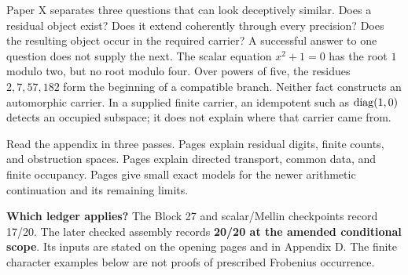 Paper X separates three questions that can look deceptively similar. Does a residual object exist? Does it extend coherently through every precision? Does the resulting object occur in the required carrier? A successful answer to one question does not supply the next.
The scalar equation $x^2+1=0$ has the root $1$ modulo two, but no root modulo four. Over powers of five, the residues $2,7,57,182$ form the beginning of a compatible branch. Neither fact constructs an automorphic carrier. In a supplied finite carrier, an idempotent such as $\operatorname{diag}(1,0)$ detects an occupied subspace; it does not explain where that carrier came from.

Read the appendix in three passes. Pages  explain residual digits, finite counts, and obstruction spaces. Pages  explain directed transport, common data, and finite occupancy. Pages  give small exact models for the newer arithmetic continuation and its remaining limits.
\begin{insight}
\textbf{Which ledger applies?} The Block 27 and scalar/Mellin checkpoints record 17/20. The later checked assembly records \textbf{20/20 at the amended conditional scope}. Its inputs are stated on the opening pages and in Appendix D. The finite character examples below are not proofs of prescribed Frobenius occurrence.
\end{insight}

